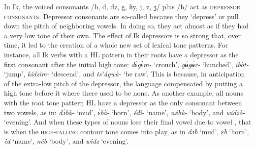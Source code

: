In Ik, the voiced consonants /b, d, dz, g, ɦy, j, z, ʒ/ plus /h/ act as \textsc{depressor consonants}. Depressor consonants are so-called because they ‘depress’ or pull down the pitch of neighboring vowels. In doing so, they act almost as if they had a very low tone of their own. The effect of Ik depressors is so strong that, over time, it led to the creation of a whole new set of lexical tone patterns. For instance, all Ik verbs with a HL pattern in their roots have a depressor as the first consonant after the initial high tone: \textit{d\'{ɛ}g\`{ɛ}m-} ‘crouch’, \textit{g\'{ʉ}g\`{ʉ}r-} ‘hunched’, \textit{íbòt-} ‘jump’, \textit{kídzìm-} ‘descend’, and \textit{tsʼágwà-} ‘be raw’. This is because, in anticipation of the extra-low pitch of the depressor, the language compensated by putting a high tone before it where there used to be none. As another example, all nouns with the root tone pattern HL have a depressor as the only consonant between two vowels, as in: \textit{d\'{ɔ}bà-} ‘mud’, \textit{\'{ɛ}bà-} ‘horn’, \textit{édì-} ‘name’, \textit{nébù-} ‘body’, and \textit{wídzò-} ‘evening’. And when these types of nouns lose their final vowel due to vowel , that is when the \textsc{high-falling} contour tone comes into play, as in \textit{d\^{ɔ}b\ᵃ} ‘mud’, \textit{\^{ɛ}b\ᵃ} ‘horn’, \textit{êd\ᵃ} ‘name’, \textit{nêb\ᵃ} `body', and \textit{wîdz\ᵃ} ‘evening’.